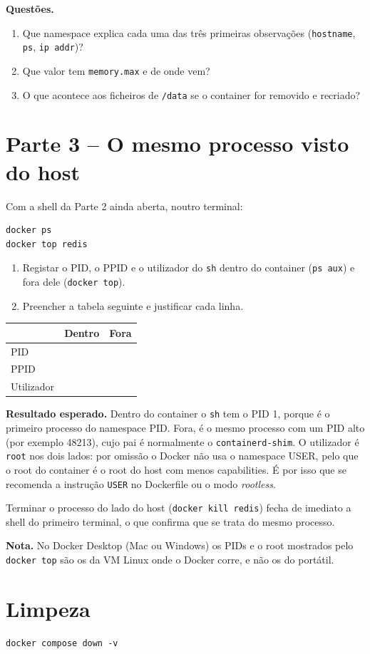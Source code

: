 \documentclass[11pt,a4paper]{article}
\begin{document}
\textbf{Questões.}
\begin{enumerate}[label=\arabic*.]
  \item Que namespace explica cada uma das três primeiras observações (\texttt{hostname}, \texttt{ps}, \texttt{ip addr})?
  \item Que valor tem \texttt{memory.max} e de onde vem?
  \item O que acontece aos ficheiros de \texttt{/data} se o container for removido e recriado?
\end{enumerate}

\section{Parte 3 -- O mesmo processo visto do host}
Com a shell da Parte 2 ainda aberta, noutro terminal:
\begin{lstlisting}
docker ps
docker top redis
\end{lstlisting}

\begin{enumerate}[label=\arabic*.]
  \item Registar o PID, o PPID e o utilizador do \texttt{sh} dentro do container (\texttt{ps aux}) e fora dele (\texttt{docker top}).
  \item Preencher a tabela seguinte e justificar cada linha.
\end{enumerate}

\begin{center}
\begin{tabular}{l|c|c}
  & Dentro & Fora \\ \hline
  PID & & \\
  PPID & & \\
  Utilizador & & \\
\end{tabular}
\end{center}

\textbf{Resultado esperado.}
Dentro do container o \texttt{sh} tem o PID 1, porque é o primeiro processo do namespace PID.
Fora, é o mesmo processo com um PID alto (por exemplo 48213), cujo pai é normalmente o \texttt{containerd-shim}.
O utilizador é \texttt{root} nos dois lados: por omissão o Docker não usa o namespace USER, pelo que o root do container é o root do host com menos capabilities.
É por isso que se recomenda a instrução \texttt{USER} no Dockerfile ou o modo \emph{rootless}.

Terminar o processo do lado do host (\texttt{docker kill redis}) fecha de imediato a shell do primeiro terminal, o que confirma que se trata do mesmo processo.

\textbf{Nota.}
No Docker Desktop (Mac ou Windows) os PIDs e o root mostrados pelo \texttt{docker top} são os da VM Linux onde o Docker corre, e não os do portátil.

\section{Limpeza}
\begin{lstlisting}
docker compose down -v
\end{lstlisting}
\end{document}
